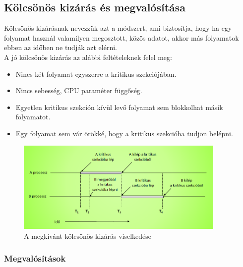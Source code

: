 \documentclass[margin=0px]{article}
\begin{document}
\subsection{Kölcsönös kizárás és megvalósítása}

Kölcsönös kizárásnak nevezzük azt a módszert, ami biztosítja, hogy ha egy folyamat használ valamilyen megosztott, közös adatot, akkor más folyamatok ebben az időben ne tudják azt elérni. \\
A jó kölcsönös kizárás az alábbi feltételeknek felel meg:
\begin{itemize}
    \item Nincs két folyamat egyszerre a kritikus szekciójában.
    \item Nincs sebesség, CPU paraméter függőség.
    \item Egyetlen kritikus szekción kívül levő folyamat sem blokkolhat másik folyamatot.
    \item Egy folyamat sem vár örökké, hogy a kritikus szekcióba tudjon belépni.
\end{itemize}

\begin{figure}[H]
    \centering
    \includegraphics[width=0.9\textwidth]{img/mutex.png}
    \caption{A megkívánt kölcsönös kizárás viselkedése}
\end{figure}

\subsubsection{Megvalósítások}
\end{document}
